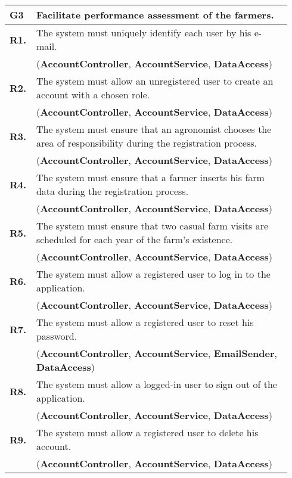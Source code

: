 \begin{longtable}{p{0.06\linewidth} p{0.88\linewidth}} 
    \toprule
    \textbf{G3} & Facilitate performance assessment of the farmers. \\
    \midrule
    
	\textbf{R1.} & The system must uniquely identify each user by his e-mail. \\
	& (\textbf{AccountController}, \textbf{AccountService}, \textbf{DataAccess})\\
	\textbf{R2.} & The system must allow an unregistered user to create an account with a chosen role. \\
	& (\textbf{AccountController}, \textbf{AccountService}, \textbf{DataAccess})\\
	\textbf{R3.} & The system must ensure that an agronomist chooses the area of responsibility during the registration process. \\
	& (\textbf{AccountController}, \textbf{AccountService}, \textbf{DataAccess})\\
	\textbf{R4.} & The system must ensure that a farmer inserts his farm data during the registration process.\\
	& (\textbf{AccountController}, \textbf{AccountService}, \textbf{DataAccess})\\
	\textbf{R5.} & The system must ensure that two casual farm visits are scheduled for each year of the farm's existence.\\
	& (\textbf{AccountController}, \textbf{AccountService}, \textbf{DataAccess})\\
	\textbf{R6.} & The system must allow a registered user to log in to the application. \\
	& (\textbf{AccountController}, \textbf{AccountService}, \textbf{DataAccess})\\
	\textbf{R7.} & The system must allow a registered user to reset his password. \\
	& (\textbf{AccountController}, \textbf{AccountService}, \textbf{EmailSender}, \textbf{DataAccess})\\
	\textbf{R8.} & The system must allow a logged-in user to sign out of the application. \\
	& (\textbf{AccountController}, \textbf{AccountService}, \textbf{DataAccess})\\
	\textbf{R9.} & The system must allow a registered user to delete his account. \\
	& (\textbf{AccountController}, \textbf{AccountService}, \textbf{DataAccess})\\
	

\end{longtable}
